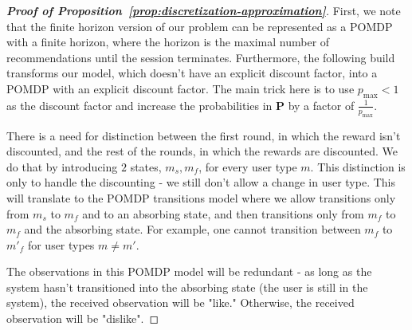 \begin{proof}[\normalfont\bfseries Proof of Proposition~\ref{prop:discretization-approximation}]
  First, we note that the finite horizon version of our problem can be represented as a POMDP with a finite horizon, where the horizon is the maximal number of recommendations until the session terminates.
  Furthermore, the following build transforms our model, which doesn't have an explicit discount factor, into a POMDP with an explicit discount factor. The main trick here is to use $p_{\max} < 1$ as the discount factor and increase the probabilities in $\bm P$ by a factor of $\frac{1}{p_{\max}}$.
  
  There is a need for distinction between the first round, in which the reward isn't discounted, and the rest of the rounds, in which the rewards are discounted. We do that by introducing $2$ states, $m_s, m_f$, for every user type $m$. This distinction is only to handle the discounting - we still don't allow a change in user type. This will translate to the POMDP transitions model where we allow transitions only from $m_s$ to $m_f$ and to an absorbing state, and then transitions only from $m_f$ to $m_f$ and the absorbing state. For example, one cannot transition between $m_f$ to $m'_f$ for user types $m \neq m'$. 
  
  The observations in this POMDP model will be redundant - as long as the system hasn't transitioned into the absorbing state (the user is still in the system), the received observation will be "like." Otherwise, the received observation will be "dislike".


\end{proof}
